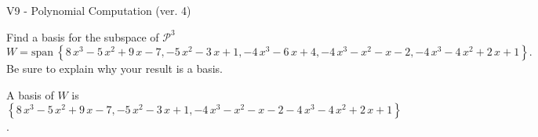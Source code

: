 \begin{exercise}
  \begin{exerciseTitle}V9 - Polynomial Computation (ver. 4)\end{exerciseTitle}
  \begin{exerciseStatement}
    Find a basis for the subspace of \(\mathcal{P}^3\) 
\[W=\mathrm{span}\ \left\{8 \, x^{3} - 5 \, x^{2} + 9 \, x - 7 , -5 \, x^{2} - 3 \, x + 1 , -4 \, x^{3} - 6 \, x + 4 , -4 \, x^{3} - x^{2} - x - 2 , -4 \, x^{3} - 4 \, x^{2} + 2 \, x + 1\right\}.\]
 Be sure to explain why your result is a basis.


  \end{exerciseStatement}
  \begin{exerciseAnswer}
   A basis of \(W\) is  \(\left\{8 \, x^{3} - 5 \, x^{2} + 9 \, x - 7 , -5 \, x^{2} - 3 \, x + 1 , -4 \, x^{3} - x^{2} - x - 2 -4 \, x^{3} - 4 \, x^{2} + 2 \, x + 1\right\}\).
  


  \end{exerciseAnswer}
\end{exercise}